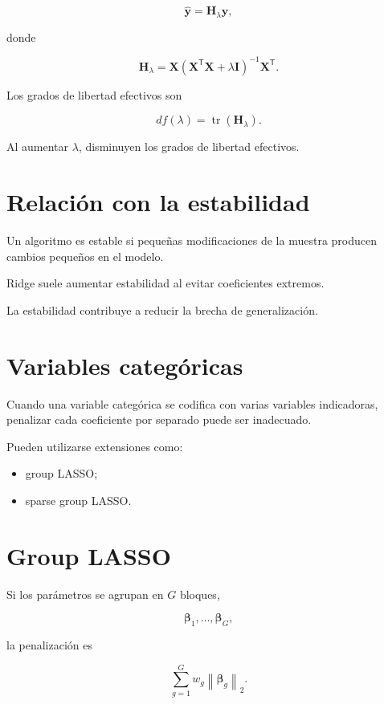 \documentclass[
  spanish,
  11pt,
  letterpaper,
  DIV=11,
  numbers=noendperiod]{scrreprt}
\providecommand{\tightlist}{%
  \setlength{\itemsep}{0pt}\setlength{\parskip}{0pt}}
\theoremstyle{definition}
\theoremstyle{plain}
\theoremstyle{definition}
\theoremstyle{remark}
\begin{document}
\[
\widehat{\mathbf{y}}
=
\mathbf{H}_{\lambda}\mathbf{y},
\]

donde

\[
\mathbf{H}_{\lambda}
=
\mathbf{X}
\left(
\mathbf{X}^{\mathsf T}\mathbf{X}
+
\lambda\mathbf{I}
\right)^{-1}
\mathbf{X}^{\mathsf T}.
\]

Los grados de libertad efectivos son

\[
df(\lambda)
=
\operatorname{tr}
(
\mathbf{H}_{\lambda}
).
\]

Al aumentar \(\lambda\), disminuyen los grados de libertad efectivos.

\section{Relación con la
estabilidad}\label{relaciuxf3n-con-la-estabilidad}

Un algoritmo es estable si pequeñas modificaciones de la muestra
producen cambios pequeños en el modelo.

Ridge suele aumentar estabilidad al evitar coeficientes extremos.

La estabilidad contribuye a reducir la brecha de generalización.

\section{Variables categóricas}\label{variables-categuxf3ricas}

Cuando una variable categórica se codifica con varias variables
indicadoras, penalizar cada coeficiente por separado puede ser
inadecuado.

Pueden utilizarse extensiones como:

\begin{itemize}
\tightlist
\item
  group LASSO;
\item
  sparse group LASSO.
\end{itemize}

\section{Group LASSO}\label{group-lasso}

Si los parámetros se agrupan en \(G\) bloques,

\[
\boldsymbol{\beta}_1,\ldots,\boldsymbol{\beta}_G,
\]

la penalización es

\[
\sum_{g=1}^{G}
w_g
\left\|
\boldsymbol{\beta}_g
\right\|_2.
\]
\end{document}
